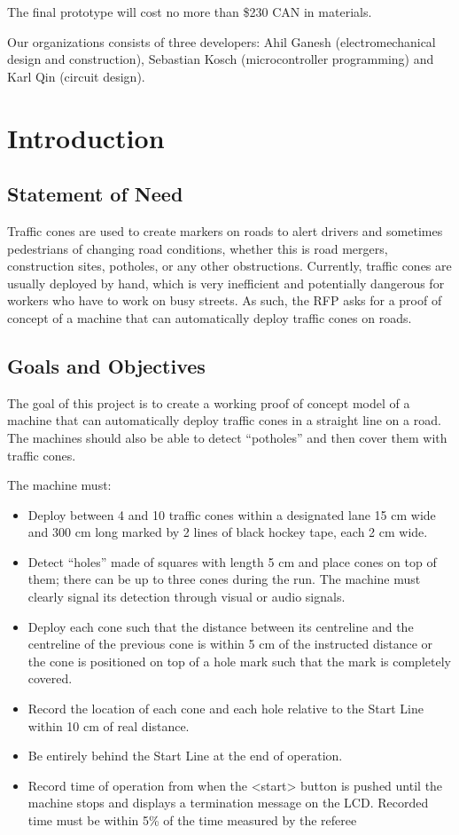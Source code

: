 \documentclass[11pt]{report}
\begin{document}
The final prototype will cost no more than \$230 CAN in materials. 

Our organizations consists of three developers: Ahil Ganesh (electromechanical design and construction), Sebastian Kosch (microcontroller programming) and Karl Qin (circuit design).

\chapter{Introduction}

\section{Statement of Need}
Traffic cones are used to create markers on roads to alert drivers and sometimes pedestrians of changing road conditions, whether this is road mergers, construction sites, potholes, or any other obstructions. Currently, traffic cones are usually deployed by hand, which is very inefficient and potentially dangerous for workers who have to work on busy streets. As such, the RFP asks for a proof of concept of a machine that can automatically deploy traffic cones on roads.
\section{Goals and Objectives}
The goal of this project is to create a working proof of concept model of a machine that can automatically deploy traffic cones in a straight line on a road. The machines should also be able to detect ``potholes'' and then cover them with traffic cones.

The machine must:

\begin{itemize}
\item{Deploy between 4 and 10 traffic cones within a designated lane 15 cm wide and 300 cm long marked by 2 lines of black hockey tape, each 2 cm wide.}
\item{Detect ``holes'' made of squares with length 5 cm and place cones on top of them; there can be up to three cones during the run. The machine must clearly signal its detection through visual or audio signals.}
\item{Deploy each cone such that the distance between its centreline and the centreline of the previous cone is within 5 cm of the instructed distance or the cone is positioned on top of a hole mark such that the mark is completely covered.}
\item{Record the location of each cone and each hole relative to the Start Line within 10 cm of real distance.}
\item{Be entirely behind the Start Line at the end of operation.}
\item{Record time of operation from when the <start> button is pushed until the machine stops and displays a termination message on the LCD. Recorded time must be within 5\% of the time measured by the referee}
\end{itemize}
\end{document}

